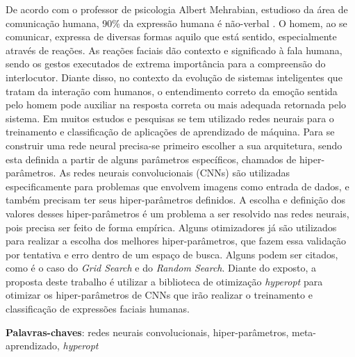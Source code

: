 \documentclass[
12pt,				%
openright,			%
oneside,			%
a4paper,			%
english,			%
french,				%
spanish,			%
brazil				%
]{abntex2}
\begin{document}

\setlength{\absparsep}{18pt} %
\begin{resumo}

De acordo com o professor de psicologia Albert Mehrabian, estudioso da área de comunicação humana, 90\% da expressão humana é não-verbal \cite{mehrabian1971silent}.  O homem, ao se comunicar, expressa de diversas formas aquilo que está sentido, especialmente através de reações. As reações faciais dão contexto e significado à fala humana, sendo os gestos executados de extrema importância para a compreensão do interlocutor. Diante disso, no contexto da evolução de sistemas inteligentes que tratam da interação com humanos, o entendimento correto da emoção sentida pelo homem pode auxiliar na resposta correta ou mais adequada retornada pelo sistema. Em muitos estudos e pesquisas se tem utilizado redes neurais para o treinamento e classificação de aplicações de aprendizado de máquina. Para se construir uma rede neural precisa-se primeiro escolher a sua arquitetura, sendo esta definida a partir de alguns parâmetros específicos, chamados de hiper-parâmetros. As redes neurais convolucionais (CNNs) são utilizadas especificamente para problemas que envolvem imagens como entrada de dados, e também precisam ter seus hiper-parâmetros definidos. A escolha e definição dos valores desses hiper-parâmetros é um problema a ser resolvido nas redes neurais, pois precisa ser feito de forma empírica. Alguns otimizadores já são utilizados para realizar a escolha dos melhores hiper-parâmetros, que fazem essa validação por tentativa e erro dentro de um espaço de busca. Alguns podem ser citados, como é o caso do \textit{Grid Search} e do \textit{Random Search}. Diante do exposto, a proposta deste trabalho é utilizar a biblioteca de otimização \textit{hyperopt} para otimizar os hiper-parâmetros de CNNs que irão realizar o treinamento e classificação de expressões faciais humanas.

\noindent
\textbf{Palavras-chaves}: redes neurais convolucionais, hiper-parâmetros, meta-aprendizado, \textit{hyperopt}

\end{resumo}
\end{document}
